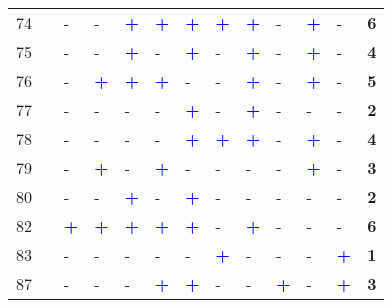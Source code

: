 \begin{longtable}{p{0.5cm}p{4.6cm}p{0.3cm}p{0.3cm}p{0.3cm}p{0.3cm}p{0.3cm}p{0.3cm}p{0.3cm}p{0.3cm}p{0.3cm}p{0.3cm}p{1cm}}
    \small{74} & \small{\textcite{halldorsdottir_home-end_2017}}\index{Halldórsdóttir, Katrín|pagebf} & - & - & \textcolor{blue}{\textbf{+}} & \textcolor{blue}{\textbf{+}} & \textcolor{blue}{\textbf{+}} & \textcolor{blue}{\textbf{+}} & \textcolor{blue}{\textbf{+}} & - & \textcolor{blue}{\textbf{+}} & - & \textbf{6}\\
    \small{75} & \small{\textcite{hamidi_shaping_2020}}\index{Hamidi, Zahra|pagebf} & - & - & \textcolor{blue}{\textbf{+}} & - & \textcolor{blue}{\textbf{+}} & - & \textcolor{blue}{\textbf{+}} & - & \textcolor{blue}{\textbf{+}} & - & \textbf{4}\\
    \small{76} & \small{\textcite{hamidi_inequalities_2019}}\index{Hamidi, Zahra|pagebf} & - & \textcolor{blue}{\textbf{+}} & \textcolor{blue}{\textbf{+}} & \textcolor{blue}{\textbf{+}} & - & - & \textcolor{blue}{\textbf{+}} & - & \textcolor{blue}{\textbf{+}} & - & \textbf{5}\\
    \small{77} & \small{\textcite{hasiak_access_2019}}\index{Hasiak, Sophie|pagebf} & - & - & - & - & \textcolor{blue}{\textbf{+}} & - & \textcolor{blue}{\textbf{+}} & - & - & - & \textbf{2}\\
    \small{78} & \small{\textcite{heinen_multimodal_2014}}\index{Heinen, Eva|pagebf} & - & - & - & - & \textcolor{blue}{\textbf{+}} & \textcolor{blue}{\textbf{+}} & \textcolor{blue}{\textbf{+}} & - & \textcolor{blue}{\textbf{+}} & - & \textbf{4}\\
    \small{79} & \small{\textcite{heumann_spatiotemporal_2021}}\index{Heumann, Maximilian|pagebf} & - & \textcolor{blue}{\textbf{+}} & - & \textcolor{blue}{\textbf{+}} & - & - & - & - & \textcolor{blue}{\textbf{+}} & - & \textbf{3}\\
    \small{80} & \small{\textcite{hochmair_assessment_2015}}\index{Hochmair, Hartwig H.|pagebf} & - & - & \textcolor{blue}{\textbf{+}} & - & \textcolor{blue}{\textbf{+}} & - & - & - & - & - & \textbf{2}\\
    \small{82} & \small{\textcite{hu_examining_2022}}\index{Hu, Songhua|pagebf} & \textcolor{blue}{\textbf{+}} & \textcolor{blue}{\textbf{+}} & \textcolor{blue}{\textbf{+}} & \textcolor{blue}{\textbf{+}} & \textcolor{blue}{\textbf{+}} & - & \textcolor{blue}{\textbf{+}} & - & - & - & \textbf{6}\\
    \small{83} & \small{\textcite{hua_transfer_2022}}\index{Hua, Mingzhuang|pagebf} & - & - & - & - & - & \textcolor{blue}{\textbf{+}} & - & - & - & \textcolor{blue}{\textbf{+}} & \textbf{1}\\
    \small{87} & \small{\textcite{jappinen_modelling_2013}}\index{Jäppinen, Sakari|pagebf} & - & - & - & \textcolor{blue}{\textbf{+}} & \textcolor{blue}{\textbf{+}} & - & - & \textcolor{blue}{\textbf{+}} & - & \textcolor{blue}{\textbf{+}} & \textbf{3}\\

\end{longtable}
